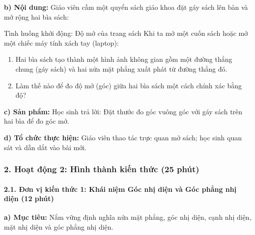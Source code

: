 \documentclass[12pt, a4paper]{article}
\begin{document}
\noindent \textbf{b) Nội dung:}
Giáo viên cầm một quyển sách giáo khoa đặt gáy sách lên bàn và mở rộng hai bìa sách:
\begin{pedabox}{Tình huống khởi động: Độ mở của trang sách}
Khi ta mở một cuốn sách hoặc mở một chiếc máy tính xách tay (laptop):
\begin{enumerate}[leftmargin=0.6cm]
    \item Hai bìa sách tạo thành một hình ảnh không gian gồm một đường thẳng chung (gáy sách) và hai nửa mặt phẳng xuất phát từ đường thẳng đó.
    \item Làm thế nào để đo độ mở (góc) giữa hai bìa sách một cách chính xác bằng độ?
\end{enumerate}
\end{pedabox}

\noindent \textbf{c) Sản phẩm:}
Học sinh trả lời: Đặt thước đo góc vuông góc với gáy sách trên hai bìa để đo góc mở.

\noindent \textbf{d) Tổ chức thực hiện:}
Giáo viên thao tác trực quan mở sách; học sinh quan sát và dẫn dắt vào bài mới.

\subsubsection*{2. Hoạt động 2: Hình thành kiến thức (25 phút)}

\paragraph{2.1. Đơn vị kiến thức 1: Khái niệm Góc nhị diện và Góc phẳng nhị diện (12 phút)}

\noindent \textbf{a) Mục tiêu:}
Nắm vững định nghĩa nửa mặt phẳng, góc nhị diện, cạnh nhị diện, mặt nhị diện và góc phẳng nhị diện.
\end{document}
